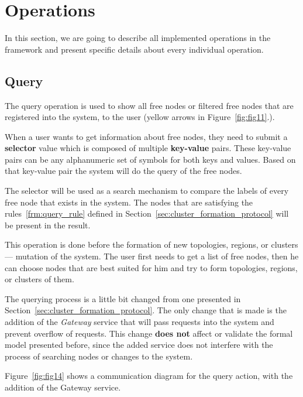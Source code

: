 \section{Operations}\label{sec:framework_operations}
%
In this section, we are going to describe all implemented operations in the framework and present specific details about every individual operation.
%
%
\subsection{Query}\label{sec:query} 
% 
The query operation is used to show all free nodes or filtered free nodes that are registered into the system, to the user (yellow arrows in Figure~\ref{fig:fig11}.). 

When a user wants to get information about free nodes, they need to submit a \textbf{selector} value which is composed of multiple \textbf{key-value} pairs.  These key-value pairs can be any alphanumeric set of symbols for both keys and values. Based on that key-value pair the system will do the query of the free nodes.

The selector will be used as a search mechanism to compare the labels of every free node that exists in the system. The nodes that are satisfying the rules~\ref{frm:query_rule} defined in Section~\ref{sec:cluster_formation_protocol} will be present in the result.

This operation is done before the formation of new topologies, regions, or clusters --- mutation of the system. The user first needs to get a list of free nodes, then he can choose nodes that are best suited for him and try to form topologies, regions, or clusters of them.

The querying process is a little bit changed from one presented in Section~\ref{sec:cluster_formation_protocol}. The only change that is made is the addition of the \emph{Gateway} service that will pass requests into the system and prevent overflow of requests. This change \textbf{does not} affect or validate the formal model presented before, since the added service does not interfere with the process of searching nodes or changes to the system.

Figure~\ref{fig:fig14} shows a communication diagram for the query action, with the addition of the Gateway service.


